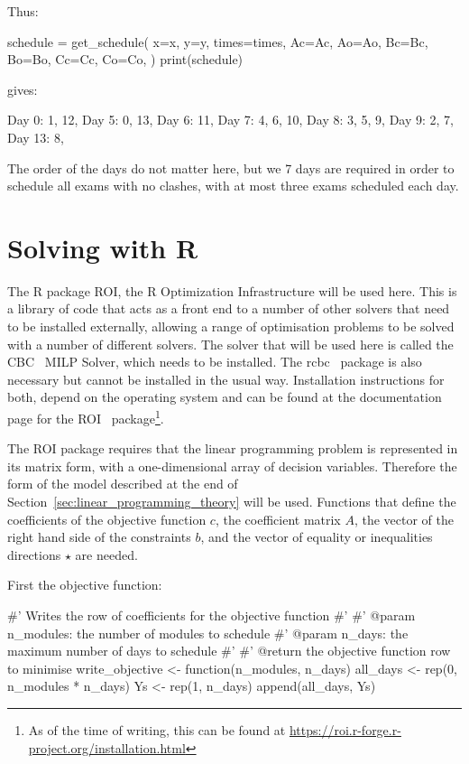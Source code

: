 Thus:

\begin{pyin}
schedule = get_schedule(
    x=x,
    y=y,
    times=times,
    Ac=Ac,
    Ao=Ao,
    Bc=Bc,
    Bo=Bo,
    Cc=Cc,
    Co=Co,
)
print(schedule)
\end{pyin}

gives:

\begin{pyout}

Day 0: 1, 12, 
Day 5: 0, 13, 
Day 6: 11, 
Day 7: 4, 6, 10, 
Day 8: 3, 5, 9, 
Day 9: 2, 7, 
Day 13: 8,
\end{pyout}

The order of the days do not matter here, but we 7 days are required in order to
schedule all exams with no clashes, with at most three exams scheduled each day.

\section{Solving with R}\label{sec:linear_programming_solving-with-R}

The R package ROI, the R Optimization Infrastructure will be used here.  This is
a library of code that acts as a front end to a number of other solvers that
need to be installed externally, allowing a range of optimisation problems to be
solved with a number of different solvers.  The solver that will be used here is
called the CBC~\cite{forrest2005cbc} MILP Solver, which needs to be
installed. The rcbc~\cite{shumacher2021rcbc} package is also necessary but
cannot be installed in the usual way. Installation instructions for both, depend
on the operating system and can be found at the documentation page for the
ROI~\cite{theussl2017roi} package\footnote{As of the time of writing, this
can be found at \url{https://roi.r-forge.r-project.org/installation.html}}.

The ROI package requires that the linear programming problem is
represented in its matrix form, with a one-dimensional array of decision
variables. Therefore the form of the model described at the end of
Section~\ref{sec:linear_programming_theory} will be used.
Functions that define the coefficients of the objective function \(c\), the coefficient
matrix \(A\), the vector of the right hand side of the constraints \(b\), and the
vector of equality or inequalities directions \(\star\) are needed.

First the objective function:

\begin{Rin-no-test}
#' Writes the row of coefficients for the objective function
#'
#' @param n_modules: the number of modules to schedule
#' @param n_days: the maximum number of days to schedule
#'
#' @return the objective function row to minimise
write_objective <- function(n_modules, n_days){
  all_days <- rep(0, n_modules * n_days)
  Ys <- rep(1, n_days)
  append(all_days, Ys)
}
\end{Rin-no-test}

